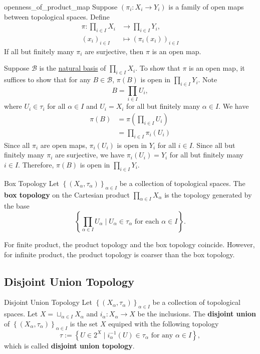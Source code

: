 \documentclass{report}
\begin{document}
\begin{proposition}{}{openness_of_product_map}
	Suppose $(\pi_i:X_i \to Y_i)$ is a family of open maps between topological spaces. Define
	\begin{align*}
		\pi: \prod_{i \in I} X_i & \longrightarrow \prod_{i \in I} Y_i, \\
		(x_i)_{i \in I}          & \longmapsto (\pi_i(x_i))_{i \in I}
	\end{align*}
	If all but finitely many $\pi_i$ are surjective, then $\pi$ is an open map.
\end{proposition}
\begin{prf}
	Suppose $\mathcal{B}$ is the \hyperref[th:basis_of_product_topology]{natural basis} of $\prod_{i \in I} X_i$. To show that $\pi$ is an open map, it suffices to show that for any $B\in \mathcal{B}$, $\pi(B)$ is open in $\prod_{i \in I} Y_i$. Note 
	\[
	B=\prod_{i\in I}U_i,
	\]
	where $U_i\in \tau_i$ for all $\alpha\in I$ and $U_i=X_i$ for all but finitely many $\alpha\in I$. We have
	\begin{align*}
		\pi(B) &= \pi\left(\prod_{i\in I}U_i\right) \\
		&= \prod_{i\in I}\pi_i(U_i) 
	\end{align*}
	Since all $\pi_i$ are open maps, $\pi_i(U_i)$ is open in $Y_i$ for all $i\in I$. Since all but finitely many $\pi_i$ are surjective, we have $\pi_i(U_i)=Y_i$ for all but finitely many $i\in I$. Therefore, $\pi(B)$ is open in $\prod_{i \in I} Y_i$.
\end{prf}

\begin{definition}{Box Topology}{}
	Let $\left\{(X_\alpha,\tau_\alpha)\right\}_{\alpha\in I}$ be a collection of topological spaces. The \textbf{box topology} on the Cartesian product $\prod_{\alpha\in I}X_\alpha$ is the topology generated by the base
	\[
		\left\{\prod_{\alpha\in I}U_\alpha\mid U_\alpha\in \tau_\alpha\text{ for each }\alpha\in I\right\}.
	\]
\end{definition}

For finite product, the product topology and the box topology coincide. However, for infinite product, the product topology is coarser than the box topology.


\subsection{Disjoint Union Topology}
\begin{definition}{Disjoint Union Topology}{}
	Let $\left\{(X_\alpha,\tau_\alpha)\right\}_{\alpha\in I}$ be a collection of topological spaces. Let $X=\sqcup_{\alpha\in I}X_\alpha$ and $i_\alpha:X_\alpha\to X$ be the inclusions. The \textbf{disjoint union} of $\left\{(X_\alpha,\tau_\alpha)\right\}_{\alpha\in I}$ is the set $X$ equiped with the following topology
	\[
		\tau:=\left\{U\in 2^{X}\mid i_{\alpha}^{-1}(U)\in \tau_\alpha\text{ for any }\alpha\in I\right\},
	\]
	which is called \textbf{disjoint union topology}.
\end{definition}
\end{document}

